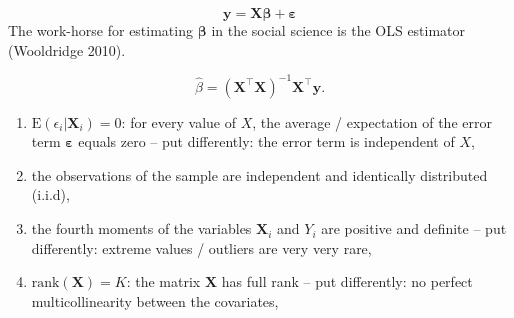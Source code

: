 \documentclass[
  letterpaper,
]{scrbook}
\begin{document}
\[
{\boldsymbol{\mathbf{y}}}={\boldsymbol{\mathbf{X}}}{\boldsymbol{\mathbf{\beta}}}+ {\boldsymbol{\mathbf{\varepsilon}}}
\] The work-horse for estimating \(\boldsymbol{\mathbf{\beta}}\) in the
social science is the OLS estimator (Wooldridge 2010).

\[
\hat{\beta}=({\boldsymbol{\mathbf{X}}}^\intercal{\boldsymbol{\mathbf{X}}})^{-1}{\boldsymbol{\mathbf{X}}}^\intercal{\boldsymbol{\mathbf{y}}}.
\]

\begin{tcolorbox}[enhanced jigsaw, colframe=quarto-callout-important-color-frame, coltitle=black, titlerule=0mm, opacitybacktitle=0.6, toprule=.15mm, colbacktitle=quarto-callout-important-color!10!white, toptitle=1mm, leftrule=.75mm, colback=white, bottomtitle=1mm, opacityback=0, left=2mm, title=\textcolor{quarto-callout-important-color}{\faExclamation}\hspace{0.5em}{OLS assumptions I}, breakable, arc=.35mm, rightrule=.15mm, bottomrule=.15mm]

\begin{enumerate}
\def\labelenumi{\arabic{enumi}.}
\item
  \(\mathrm{E}(\epsilon_i|\boldsymbol{\mathbf{X}}_i) = 0\): for every
  value of \(X\), the average / expectation of the error term
  \(\boldsymbol{\mathbf{\varepsilon}}\) equals zero -- put differently:
  the error term is independent of \(X\),
\item
  the observations of the sample are independent and identically
  distributed (i.i.d),
\item
  the fourth moments of the variables \(\boldsymbol{\mathbf{X}}_i\) and
  \(Y_i\) are positive and definite -- put differently: extreme values /
  outliers are very very rare,
\item
  \(\text{rank}(\boldsymbol{\mathbf{X}}) = K\): the matrix
  \(\boldsymbol{\mathbf{X}}\) has full rank -- put differently: no
  perfect multicollinearity between the covariates,
\end{enumerate}

\end{tcolorbox}
\end{document}
